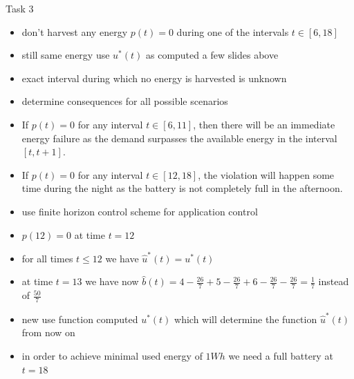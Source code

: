 \begin{frame}[allowframebreaks]{Task 3}{}
\begin{solution}
\begin{figure}
    \end{figure}
  \end{solution}
  \framebreak
  \begin{tasknoinc}
    \begin{itemize}
      \item don't harvest any energy $p(t) = 0$ during one of the intervals $t\in[6, 18]$
      \item still same energy use $u^*(t)$ as computed a few slides above
      \item exact interval during which no energy is harvested is unknown
      \item determine consequences for all possible scenarios
    \end{itemize}
  \end{tasknoinc}
  \framebreak
  \begin{solution}
    \begin{itemize}
       \item If $p(t)=0$ for any interval $t \in[6,11]$, then there will be an immediate energy failure as the demand surpasses the available energy in the interval $[t, t+1]$.
      \item If $p(t)=0$ for any interval $t \in[12,18]$, the violation will happen some time during the night as the battery is not completely full in the afternoon.
    \end{itemize}
  \end{solution}
  \framebreak
  \begin{tasknoinc}
    \begin{itemize}
      \item use finite horizon control scheme for application control
      \item $p(12) = 0$ at time $t = 12$
    \end{itemize}
  \end{tasknoinc}
  \begin{solutionnoinc}
    \begin{itemize}
      \item for all times $t\le 12$ we have $\hat u^*(t) = u^*(t)$
      \item at time $t=13$ we have now $\hat b(t)= 4 - \frac{26}{7} + 5 - \frac{26}{7} + 6 - \frac{26}{7} - \frac{26}{7} =\frac{1}{7}$ instead of $\frac{50}{7}$
      \item new use function computed $u^*(t)$ which will determine the function $\hat u^*(t)$ from now on
      \item in order to achieve minimal used energy of $1Wh$ we need a full battery at $t=18$

\end{itemize}
\end{solutionnoinc}
\end{frame}
